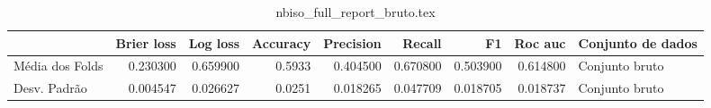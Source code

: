 \begin{table}
\centering
\caption{nbiso_full_report_bruto.tex}
\label{nbiso_full_report_bruto.tex}
\begin{tabular}{lrrrrrrrl}
\toprule
{} &  Brier  loss &  Log loss &  Accuracy  &  Precision  &   Recall  &       F1  &  Roc auc  & Conjunto de dados \\
\midrule
Média dos Folds &     0.230300 &  0.659900 &     0.5933 &    0.404500 &  0.670800 &  0.503900 &  0.614800 &    Conjunto bruto \\
Desv. Padrão    &     0.004547 &  0.026627 &     0.0251 &    0.018265 &  0.047709 &  0.018705 &  0.018737 &    Conjunto bruto \\
\bottomrule
\end{tabular}
\end{table}
